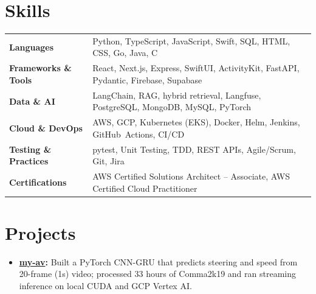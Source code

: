 \documentclass[11pt, letterpaper]{article}
\begin{document}
\section{Skills}
\begin{tabularx}{\textwidth}{@{}l @{\hspace{7pt}} >{\raggedright\arraybackslash}X@{}}
  \textbf{Languages} & Python, TypeScript, JavaScript, Swift, SQL, HTML, CSS, Go, Java, C \\[1pt]
  \textbf{Frameworks \& Tools} & React, Next.js, Express, SwiftUI, ActivityKit, FastAPI, Pydantic, Firebase, Supabase \\[1pt]
  \textbf{Data \& AI} & LangChain, RAG, hybrid retrieval, Langfuse, PostgreSQL, MongoDB, MySQL, PyTorch \\[1pt]
  \textbf{Cloud \& DevOps} & AWS, GCP, Kubernetes (EKS), Docker, Helm, Jenkins, GitHub~Actions, CI/CD \\[1pt]
  \textbf{Testing \& Practices} & pytest, Unit Testing, TDD, REST APIs, Agile/Scrum, Git, Jira \\[1pt]
  \textbf{Certifications} & AWS Certified Solutions Architect -- Associate, AWS Certified Cloud Practitioner \\
\end{tabularx}

\section{Projects}
\begin{itemize}
  \item \textbf{\href{https://github.com/lordphone/my-av}{my-av}:} Built a PyTorch CNN-GRU that predicts steering and speed from 20-frame (1s) video; processed 33 hours of Comma2k19 and ran streaming inference on local CUDA and GCP Vertex AI.
\end{itemize}
\end{document}
